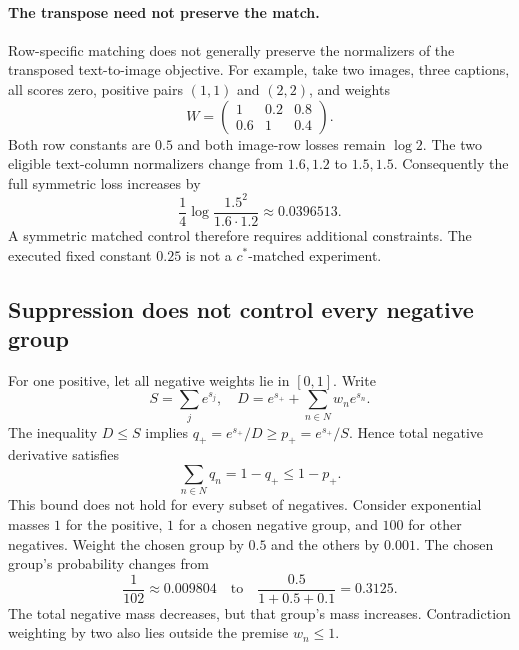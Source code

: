 \paragraph{The transpose need not preserve the match.}
Row-specific matching does not generally preserve the normalizers of the transposed text-to-image objective. For example, take two images, three captions, all scores zero, positive pairs $(1,1)$ and $(2,2)$, and weights
\begin{equation}
W=\begin{pmatrix}1&0.2&0.8\\0.6&1&0.4\end{pmatrix}.
\end{equation}
Both row constants are $0.5$ and both image-row losses remain $\log2$. The two eligible text-column normalizers change from $1.6,1.2$ to $1.5,1.5$. Consequently the full symmetric loss increases by
\begin{equation}
\frac14\log\frac{1.5^2}{1.6\cdot1.2}\approx0.0396513.
\end{equation}
A symmetric matched control therefore requires additional constraints. The executed fixed constant $0.25$ is not a $c^*$-matched experiment.

\subsection{Suppression does not control every negative group}
For one positive, let all negative weights lie in $[0,1]$. Write
\begin{equation}
S=\sum_je^{s_j},\quad D=e^{s_+}+\sum_{n\in N}w_ne^{s_n}.
\end{equation}
The inequality $D\leq S$ implies $q_+=e^{s_+}/D\geq p_+=e^{s_+}/S$. Hence total negative derivative satisfies
\begin{equation}
\sum_{n\in N}q_n=1-q_+\leq1-p_+.
\end{equation}
This bound does not hold for every subset of negatives. Consider exponential masses $1$ for the positive, $1$ for a chosen negative group, and $100$ for other negatives. Weight the chosen group by $0.5$ and the others by $0.001$. The chosen group's probability changes from
\begin{equation}
\frac{1}{102}\approx0.009804\quad\text{to}\quad\frac{0.5}{1+0.5+0.1}=0.3125.
\end{equation}
The total negative mass decreases, but that group's mass increases. Contradiction weighting by two also lies outside the premise $w_n\leq1$.

